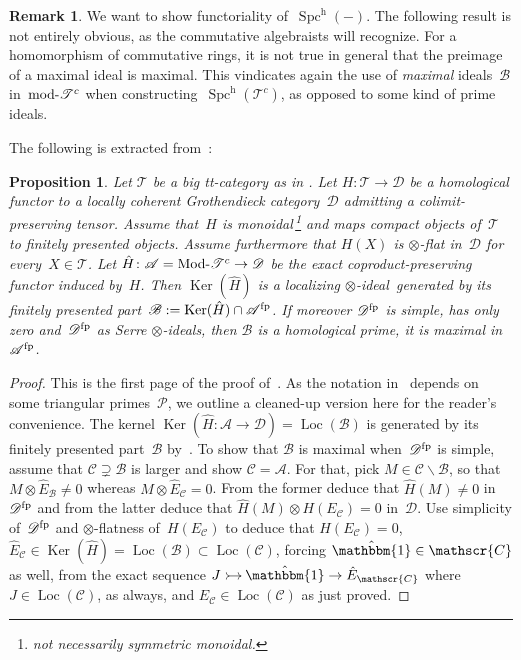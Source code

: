 \documentclass[JEP,XML,SOM,Unicode]{cedram}
\makeatletter
\newcommand{\into}{\mathchoice{\xymatrix@=.5cm{\ar@{>->}[r]&}}
{\xymatrix@=.3cm{\ar@{>->}[r]&}\hspace*{-1mm}}
{\hspace*{-1mm}\xymatrix@=.25cm{\ar@{>->}[r]&}\hspace*{-1.5mm}}
{\xymatrix@=.1cm{\ar@{>->}[r]&}\hspace*{-1mm}}
}
\numberwithin{equation}{section}
\newtheorem{Prop}[equation]{Proposition}
\theoremstyle{definition}
\newtheorem{Rem}[equation]{Remark}
\DeclareMathOperator{\Ker}{Ker}
\DeclareMathOperator{\Spc}{Spc}
\newcommand{\cat}[1]{\mathscr{#1}}
\newcommand{\unit}{\mathbbm{1}}
\DeclareMathOperator{\Loc}{Loc}
\DeclareMathOperator{\modname}{mod}
\DeclareMathOperator{\Mod}{Mod}
\newcommand{\smallh}{\mathrm{h}}
\newcommand{\cA}{\cat{A}}
\newcommand{\cB}{\cat{B}}
\newcommand{\cC}{\cat{C}}
\newcommand{\cD}{\cat{D}}
\newcommand{\cP}{\cat{P}}
\newcommand{\cT}{\cat{T}}
\newcommand{\EC}{E_{\cC}}
\newcommand{\fp}{^{\textup{fp}}}
\newcommand{\hEB}{\hat E_{\cB}}
\newcommand{\hEC}{\hat E_{\cC}}
\newcommand{\hunit}{\hat\unit}
\newcommand{\modd}{\modname\text{\!-}}
\newcommand{\Modd}{\Mod\text{\!-}}
\newcommand{\MT}{\Modd\cat T^c}
\newcommand{\mT}{\modd\cat T^c}
\newcommand{\SpchT}{\Spch(\cat{T}^c)}
\newcommand{\Spch}{\Spc^{\smallh}}
\newcommand{\tensids}{$\otimes$\nobreakdash-ideals}
\newcommand{\tensid}{$\otimes$\nobreakdash-ideal}
\makeatother
\begin{document}
\begin{Rem}
We want to show functoriality of~$\Spch(-)$. The following result is not entirely obvious, as the commutative algebraists will recognize. For a homomorphism of commutative rings, it is not true in general that the preimage of a maximal ideal is maximal. This vindicates again the use of \emph{maximal} ideals~$\cB$ in~$\mT$ when constructing~$\SpchT$, as opposed to some kind of prime ideals.
\end{Rem}

The following is extracted from~\cite{Balmer20a}:
\begin{Prop}
\label{Prop:Finv}
Let $\cT$ be a big tt-category as in . Let $H\colon \cT\to \cD$ be a homological functor to a locally coherent Grothendieck category~$\cD$ admitting a colimit-preserving tensor. Assume that~$H$ is monoidal\,\footnote{not necessarily \emph{symmetric} monoidal.} and maps compact objects of~$\cT$ to finitely presented objects. Assume furthermore that $H(X)$ is $\otimes$-flat in~$\cD$ for every~$X\in\cT$. Let $\hat H\colon \cA=\MT\to \cD$ be the exact coproduct-preserving functor induced by~$H$. Then $\Ker(\hat H)$ is a localizing \tensid\ generated by its finitely presented part~$\cB:=\Ker(\hat H)\cap \cA\fp$. If moreover $\cD\fp$ is simple, \ie has only zero and~$\cD\fp$ as Serre \tensids, then $\cB$ is a homological prime, \ie it is maximal in~$\cA\fp$.
\end{Prop}

\begin{proof}
This is the first page of the proof of~\cite[Th.\,5.6]{Balmer20a}. As the notation in \loccit\ depends on some triangular primes~$\cP$, we outline a cleaned-up version here for the reader's convenience. The kernel $\Ker(\hat H\colon \cA\to \cD)=\Loc(\cB)$ is generated by its finitely presented part~$\cB$ by~\cite[Prop.\,A.6]{BalmerKrauseStevenson19}. To show that $\cB$ is maximal when~$\cD\fp$ is simple, assume that $\cC\supsetneq\cB$ is larger and show $\cC=\cA$. For that, pick $M\in\cC\smallsetminus\cB$, so that $M\otimes\hEB\neq 0$ whereas $M\otimes\hEC=0$. From the former deduce that $\hat H(M)\neq 0$ in~$\cD\fp$ and from the latter deduce that $\hat H(M)\otimes H(\EC)=0$ in~$\cD$. Use simplicity of~$\cD\fp$ and $\otimes$\nobreakdash-flatness of~$H(\EC)$ to deduce that $H(\EC)=0$, \ie $\hEC\in\Ker(\hat H)=\Loc(\cB)\subset\Loc(\cC)$, forcing $\hunit\in\cC$ as well, from the exact sequence $J\into \hunit\to \hEC$ where $J\in\Loc(\cC)$, as always, and $\EC\in\Loc(\cC)$ as just proved.
\end{proof}
\end{document}
